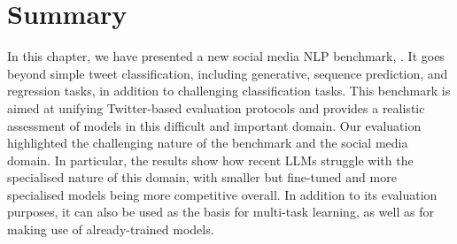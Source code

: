 \section{Summary}
In this chapter, we have presented a new social media \ac{NLP} benchmark, {\DATASET}. It goes beyond simple tweet classification,  including generative, sequence prediction, and regression tasks, in addition to challenging classification tasks. This benchmark is aimed at unifying Twitter-based evaluation protocols and provides a realistic assessment of models in this difficult and important domain. Our evaluation highlighted the challenging nature of the benchmark and the social media domain. In particular, the results show how recent \ac{LLMs} struggle with the specialised nature of this domain, with smaller but fine-tuned and more specialised models being more competitive overall. In addition to its evaluation purposes, it can also be used as the basis for multi-task learning, as well as for making use of already-trained models. 







